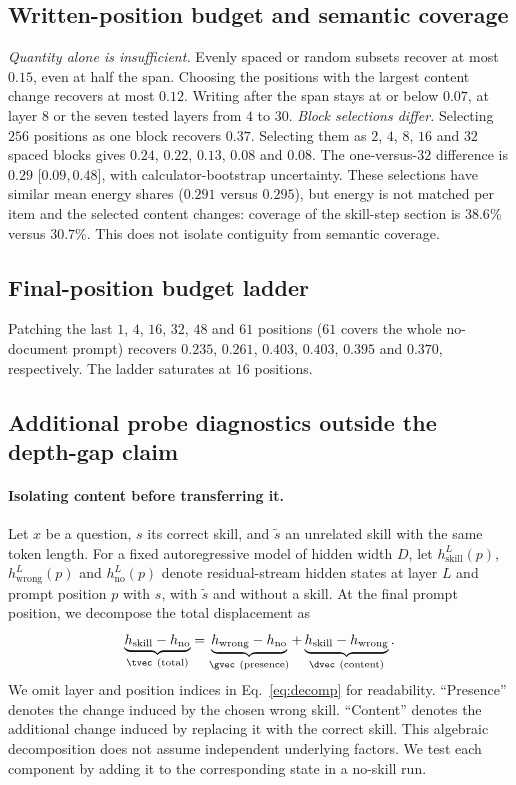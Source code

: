 \subsection{Written-position budget and semantic coverage}
\label{app:budgetdetails}
\emph{Quantity alone is insufficient.} Evenly spaced or random subsets
recover at most $0.15$, even at half the span. Choosing the positions with
the largest content change recovers at most $0.12$. Writing after the span
stays at or below $0.07$, at layer $8$ or the seven tested layers from $4$ to $30$.
\emph{Block selections differ.} Selecting $256$ positions as one block
recovers $0.37$. Selecting them as $2$, $4$, $8$, $16$ and $32$ spaced blocks
gives $0.24$, $0.22$, $0.13$, $0.08$ and $0.08$. The one-versus-$32$ difference
is $0.29$ [$0.09,0.48$], with calculator-bootstrap uncertainty. These selections
have similar mean energy shares ($0.291$ versus $0.295$), but energy is not
matched per item and the selected content changes: coverage of the skill-step section is
$38.6\%$ versus $30.7\%$. This does not isolate contiguity from semantic coverage.


\subsection{Final-position budget ladder}
Patching the last $1$, $4$, $16$, $32$, $48$ and $61$ positions
($61$ covers the whole no-document prompt) recovers
$0.235$, $0.261$, $0.403$, $0.403$, $0.395$ and $0.370$, respectively.
The ladder saturates at $16$ positions.

\subsection{Additional probe diagnostics outside the depth-gap claim}
\paragraph{Isolating content before transferring it.}
Let $x$ be a question, $s$ its correct skill, and $\tilde{s}$ an unrelated skill
with the same token length. For a fixed autoregressive model of hidden width
$D$, let $h^L_{\mathrm{skill}}(p)$, $h^L_{\mathrm{wrong}}(p)$ and
$h^L_{\mathrm{no}}(p)$ denote residual-stream hidden states at layer $L$ and prompt position
$p$ with $s$, with $\tilde{s}$ and without a skill. At the final prompt position,
we decompose the total displacement as
\begin{equation}
\underbrace{h_{\mathrm{skill}}-h_{\mathrm{no}}}_{\tvec\ \text{(total)}}
=
\underbrace{h_{\mathrm{wrong}}-h_{\mathrm{no}}}_{\gvec\ \text{(presence)}}
+
\underbrace{h_{\mathrm{skill}}-h_{\mathrm{wrong}}}_{\dvec\ \text{(content)}}.
\label{eq:decomp}
\end{equation}
We omit layer and position indices in Eq.~\ref{eq:decomp} for readability.
``Presence'' denotes the change induced by the chosen wrong skill. ``Content''
denotes the additional change induced by replacing it with the correct skill.
This algebraic decomposition does not assume independent underlying factors.
We test each component by adding it to the corresponding state in a no-skill run.



